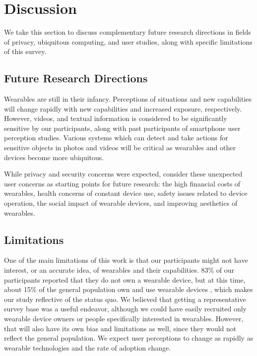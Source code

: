\documentclass{acm_proc_article-sp}
\begin{document}

\section{Discussion}
We take this section to discuss complementary future research directions in fields of privacy, ubiquitous computing, and user studies, along with specific limitations of this survey. 

\subsection{Future Research Directions}
Wearables are still in their infancy. Perceptions of situations and new capabilities will change rapidly with new capabilities and increased exposure, respectively. However, videos, and textual information is considered to be significantly sensitive by our participants, along with past participants of smartphone user perception studies. Various systems which can detect and take actions for sensitive objects in photos and videos will be critical as wearables and other devices become more ubiquitous.

While privacy and security concerns were expected, consider these unexpected user concerns as starting points for future research: the high financial costs of wearables, health concerns of constant device use, safety issues related to device operation, the social impact of wearable devices, and improving aesthetics of wearables.  

\subsection{Limitations}
One of the main limitations of this work is that our participants might not have interest, or an accurate idea, of wearables and their capabilities. 83\% of our participants reported that they do not own a wearable device, but at this time, about 15\% of the general population own and use wearable devices \cite{Nilsen,WearableStatNews}, which makes our study reflective of the status quo. We believed that getting a representative survey base was a useful endeavor, although we could have easily recruited only wearable device owners or people specifically interested in wearables. However, that will also have its own bias and limitations as well, since they would not reflect the general population. We expect user perceptions to change as rapidly as wearable technologies and the rate of adoption change. 
\end{document}
